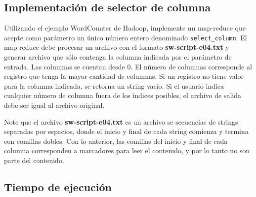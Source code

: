 \documentclass[12pt,letterpaper,twoside]{article}
\begin{document}
\begin{code}[H]
    
\end{code}

\begin{code}[H]
    
\end{code}

\subsection{Implementación de selector de columna}

{\color{red} Utilizando el ejemplo WordCounter de Hadoop, implemente un map-reduce que acepte como parámetro un único número entero denominado \texttt{select\_column}. El map-reduce debe procesar un archivo con el formato \textbf{sw-script-e04.txt} y generar archivo que sólo contenga la columna indicada por el parámetro de entrada. Las columnas se cuentan desde 0. El número de columnas corresponde al registro que tenga la mayor cantidad de columnas. Si un registro no tiene valor para la columna indicada, se retorna un string vacío. Si el usuario indica cualquier número de columna fuera de los índices posibles, el archivo de salida debe ser igual al archivo original.

    Note que el archivo \textbf{sw-script-e04.txt} es un archivo se secuencias de strings separadas por espacios, donde el inicio y final de cada string comienza y termina con comillas dobles. Con lo anterior, las comillas del inicio y final de cada columna corresponden a marcadores para leer el contenido, y por lo tanto no son parte del contenido.
}

\begin{code}[H]
    
\end{code}

\begin{code}[H]
    
\end{code}

\subsection{Tiempo de ejecución}
\end{document}
